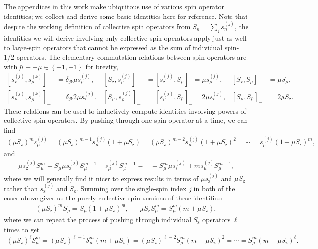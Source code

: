 \documentclass[aps,11pt,notitlepage,nofootinbib,longbibliography]{revtex4-1}
\newcommand{\p}[1]{\left(#1\right)} %
\renewcommand{\sp}[1]{\left[#1\right]} %
\renewcommand{\set}[1]{\left\{#1\right\}} %
\newcommand{\z}{\text{z}}
\newcommand{\bmu}{{\bar\mu}}
\newcommand{\1}{\mathds{1}}
\begin{document}
The appendices in this work make ubiquitous use of various spin
operator identities; we collect and derive some basic identities here
for reference.  Note that despite the working definition of collective
spin operators from $S_n=\sum_js_n^{(j)}$, the identities we will
derive involving only collective spin operators apply just as well to
large-spin operators that cannot be expressed as the sum of individual
spin-1/2 operators.  The elementary commutation relations between spin
operators are, with $\bmu\equiv-\mu\in\set{+1,-1}$ for brevity,
\begin{align}
  \sp{s_\z^{(j)},s_\mu^{(k)}}_-
  &= \delta_{jk} \mu s_\mu^{(j)},
  &
  \sp{S_\z,s_\mu^{(j)}}_-
  &= \sp{s_\z^{(j)},S_\mu}_- = \mu s_\mu^{(j)},
  &
  \sp{S_\z,S_\mu}_-
  &= \mu S_\mu,
  \label{eq:comm_z_base} \\
  \sp{s_\mu^{(j)},s_\bmu^{(k)}}_-
  &= \delta_{jk} 2 \mu s_\z^{(j)},
  &
  \sp{S_\mu,s_\bmu^{(j)}}_-
  &= \sp{s_\mu^{(j)},S_\bmu}_- = 2 \mu s_\z^{(j)},
  &
  \sp{S_\mu,S_\bmu}_-
  &= 2 \mu S_\z.
  \label{eq:comm_mu_base}
\end{align}
These relations can be used to inductively compute identities
involving powers of collective spin operators.  By pushing through one
spin operator at a time, we can find
\begin{align}
  \p{\mu S_\z}^m s_\mu^{(j)}
  = \p{\mu S_\z}^{m-1} s_\mu^{(j)} \p{1 + \mu S_\z}
  = \p{\mu S_\z}^{m-2} s_\mu^{(j)} \p{1 + \mu S_\z}^2
  = \cdots
  = s_\mu^{(j)} \p{1 + \mu S_\z}^m,
  \label{eq:push_z_mu_Ss}
\end{align}
and
\begin{align}
  \mu s_\z^{(j)} S_\mu^m
  = S_\mu \mu s_\z^{(j)} S_\mu^{m-1} + s_\mu^{(j)} S_\mu^{m-1}
  = \cdots
  = S_\mu^m \mu s_\z^{(j)} + ms_\mu^{(j)} S_\mu^{m-1},
  \label{eq:push_z_mu_sS}
\end{align}
where we will generally find it nicer to express results in terms of
$\mu s_\z^{(j)}$ and $\mu S_\z$ rather than $s_\z^{(j)}$ and $S_\z$.
Summing over the single-spin index $j$ in both of the cases above
gives us the purely collective-spin versions of these identities:
\begin{align}
  \p{\mu S_\z}^m S_\mu = S_\mu \p{1 + \mu S_\z}^m,
  &&
  \mu S_\z S_\mu^m = S_\mu^m \p{m + \mu S_\z},
  \label{eq:push_z_mu_single}
\end{align}
where we can repeat the process of pushing through individual $S_\z$
operators $\ell$ times to get
\begin{align}
  \p{\mu S_\z}^\ell S_\mu^m
  = \p{\mu S_\z}^{\ell-1} S_\mu^m \p{m + \mu S_\z}
  = \p{\mu S_\z}^{\ell-2} S_\mu^m \p{m + \mu S_\z}^2
  = \cdots
  = S_\mu^m \p{m + \mu S_\z}^\ell.
  \label{eq:push_z_mu}
\end{align}
\end{document}

